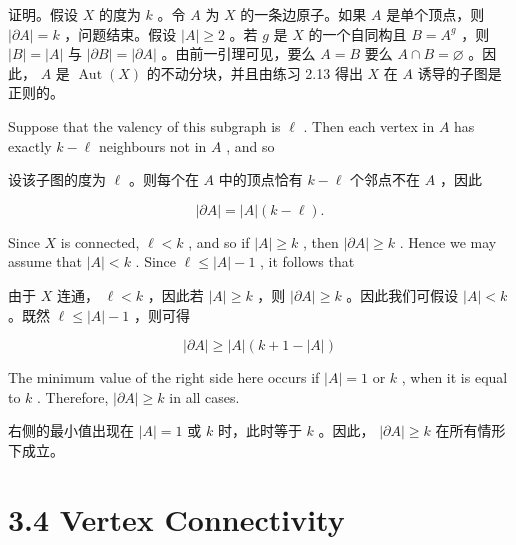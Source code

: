 \documentclass[10pt]{article}
\begin{document}
\begin{tcolorbox}\relax
证明。假设 \(X\) 的度为 \(k\) 。令 \(A\) 为 \(X\) 的一条边原子。如果 \(A\) 是单个顶点，则 \(\left| {\partial A}\right|  = k\) ，问题结束。假设 \(\left| A\right|  \geq  2\) 。若 \(g\) 是 \(X\) 的一个自同构且 \(B = {A}^{g}\) ，则 \(\left| B\right|  = \left| A\right|\) 与 \(\left| {\partial B}\right|  = \left| {\partial A}\right|\) 。由前一引理可见，要么 \(A = B\) 要么 \(A \cap  B = \varnothing\) 。因此， \(A\) 是 \(\operatorname{Aut}\left( X\right)\) 的不动分块，并且由练习 2.13 得出 \(X\) 在 \(A\) 诱导的子图是正则的。
\end{tcolorbox}

Suppose that the valency of this subgraph is \(\ell\) . Then each vertex in \(A\) has exactly \(k - \ell\) neighbours not in \(A\) , and so

\begin{tcolorbox}\relax
设该子图的度为 \(\ell\) 。则每个在 \(A\) 中的顶点恰有 \(k - \ell\) 个邻点不在 \(A\) ，因此
\end{tcolorbox}

\[
\left| {\partial A}\right|  = \left| A\right| \left( {k - \ell }\right) .
\]

Since \(X\) is connected, \(\ell  < k\) , and so if \(\left| A\right|  \geq  k\) , then \(\left| {\partial A}\right|  \geq  k\) . Hence we may assume that \(\left| A\right|  < k\) . Since \(\ell  \leq  \left| A\right|  - 1\) , it follows that

\begin{tcolorbox}\relax
由于 \(X\) 连通， \(\ell  < k\) ，因此若 \(\left| A\right|  \geq  k\) ，则 \(\left| {\partial A}\right|  \geq  k\) 。因此我们可假设 \(\left| A\right|  < k\) 。既然 \(\ell  \leq  \left| A\right|  - 1\) ，则可得
\end{tcolorbox}

\[
\left| {\partial A}\right|  \geq  \left| A\right| \left( {k + 1 - \left| A\right| }\right)
\]

The minimum value of the right side here occurs if \(\left| A\right|  = 1\) or \(k\) , when it is equal to \(k\) . Therefore, \(\left| {\partial A}\right|  \geq  k\) in all cases.

\begin{tcolorbox}\relax
右侧的最小值出现在 \(\left| A\right|  = 1\) 或 \(k\) 时，此时等于 \(k\) 。因此， \(\left| {\partial A}\right|  \geq  k\) 在所有情形下成立。
\end{tcolorbox}

\section*{3.4 Vertex Connectivity}
\end{document}
